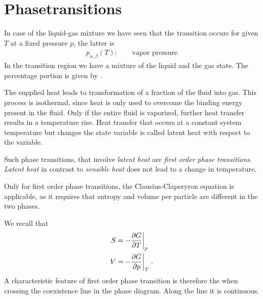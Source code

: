 \section{Phasetransitions}

In case of the liquid-gas mixture we have seen that the transition occurs for given $T$ at a fixed pressure $p$, the latter is
%
\begin{align*}
p_{\alpha,\beta}(T):\qquad\text{vapor pressure} 
\end{align*}
%
In the transition region we have a mixture of the liquid and the gas state. The percentage portion is given by .

The supplied heat leads to transformation of a fraction of the  fluid into gas. This process is isothermal, since heat is only used to overcome the binding energy present in the fluid.
Only if the entire  fluid is vaporized, further heat transfer results in a temperature rise.
Heat transfer that occurs at a constant system temperature but changes the state variable is 
called latent heat with respect to the variable.

Such phase transitions, that involve {\em latent heat} are {\em first order phase transitions}.
{\em Latent heat} in contrast to {\em sensible heat} does not lead to a change in temperature.

Only for first order phase transitions, the Clausius-Claperyron equation is applicable, as it 
requires that entropy and volume per particle are different in the two phases.

We recall that 
%
\begin{align}\label{eq:}
S &= -\frac{\partial G}{\partial T}\bigg|_{p}\\
V &= -\frac{\partial G}{\partial p}\bigg|_{T}\;.
\end{align}
%
A characteristic feature of first order phase transition is therefore the  when crossing the coexistence line in the phase diagram.
Along the line it is continuous.

